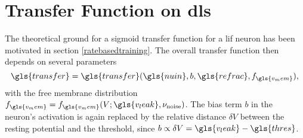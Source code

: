 \section{Transfer Function on \gls{dls}}
%
%		

The theoretical ground for a sigmoid transfer function for a \gls{lif} neuron has been motivated in section \cref{ratebasedtraining}. The overall transfer function then depends on several parameters
\begin{equation}
\gls{transfer} = \gls{transfer}(\gls{nuin}, b, \gls{refrac}, f_{\gls{v_mem}}),
\end{equation}
with the free membrane distribution $f_{\gls{v_mem}} = f_{\gls{v_mem}}(V; \gls{v_leak}, \nu_\text{noise})$. 
The bias term $b$ in the neuron's activation is again replaced by the relative distance $\delta V$ between the resting potential and the threshold, since $b \propto \delta V = \gls{v_leak} - \gls{thres}$. 

